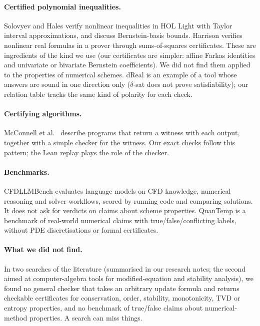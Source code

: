 \documentclass[11pt,a4paper]{article}
\begin{document}
\paragraph{Certified polynomial inequalities.} Solovyev and Hales \cite{solovyev2013} verify nonlinear
inequalities in HOL Light with Taylor interval approximations, and discuss Bernstein-basis bounds.
Harrison \cite{harrison2007} verifies nonlinear real formulas in a prover through sums-of-squares
certificates. These are ingredients of the kind we use (our certificates are simpler: affine Farkas
identities and univariate or bivariate Bernstein coefficients). We did not find them applied to the
properties of numerical schemes. dReal \cite{dreal2013} is an example of a tool whose answers are
sound in one direction only ($\delta$-sat does not prove satisfiability); our relation table tracks the
same kind of polarity for each check.

\paragraph{Certifying algorithms.} McConnell et al.\ \cite{mcconnell2011} describe programs that
return a witness with each output, together with a simple checker for the witness. Our exact checks
follow this pattern; the Lean replay plays the role of the checker.

\paragraph{Benchmarks.} CFDLLMBench \cite{cfdllmbench2025} evaluates language models on CFD knowledge,
numerical reasoning and solver workflows, scored by running code and comparing solutions. It does not
ask for verdicts on claims about scheme properties. QuanTemp \cite{quantemp2024} is a benchmark of
real-world numerical claims with true/false/conflicting labels, without PDE discretisations or
formal certificates.

\paragraph{What we did not find.} In two searches of the literature (summarised in our research
notes; the second aimed at computer-algebra tools for modified-equation and stability analysis), we
found no general checker that takes an arbitrary update formula and returns checkable certificates
for conservation, order, stability, monotonicity, TVD or entropy properties, and no benchmark of
true/false claims about numerical-method properties. A search can miss things.
\end{document}
